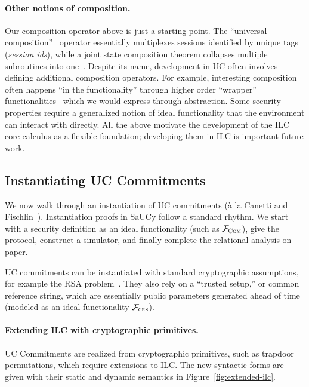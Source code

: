 \paragraph{Other notions of composition.}
Our composition operator above is just a starting point.
The ``universal composition''~\cite{canetti2001universally} operator essentially multiplexes sessions identified by unique tags (\emph{session ids}), while a joint state composition theorem collapses multiple subroutines into one~\cite{canetti2003universal}.
Despite its name, development in UC often involves defining additional composition operators. 
For example, interesting composition often happens ``in the functionality''
through higher order ``wrapper''
functionalities~\cite{kosba2016hawk,katz2007universally} which we would express
through abstraction. Some security properties require a generalized notion of
ideal functionality that the environment can interact with directly. All the
above motivate the development of the ILC core calculus as a flexible
foundation; developing them in ILC is important future work. 


\subsection{Instantiating UC Commitments}
\label{subsec:example}
We now walk through an instantiation of UC commitments (\`{a} la Canetti and
Fischlin~\cite{canetti2001commitments}).  Instantiation proofs in SaUCy follow a
standard rhythm. We start with a security definition as an ideal functionality
(such as $\mathcal{{F}}_{\textsc{Com}}$), give the protocol, construct a simulator, and
finally complete the relational analysis on paper.

UC commitments can be instantiated with standard cryptographic assumptions, for
example the RSA problem~\cite{lindell2014introduction}.  They also rely on a
``trusted setup,'' or common reference string, which are essentially public
parameters generated ahead of time (modeled as an ideal functionality
$\mathcal{{F}}_{\textsc{crs}}$).

\paragraph{Extending ILC with cryptographic primitives.}
UC Commitments are realized from cryptographic primitives, such as trapdoor
permutations, which require extensions to ILC. The new syntactic forms are given
with their static and dynamic semantics in Figure~\ref{fig:extended-ilc}.

